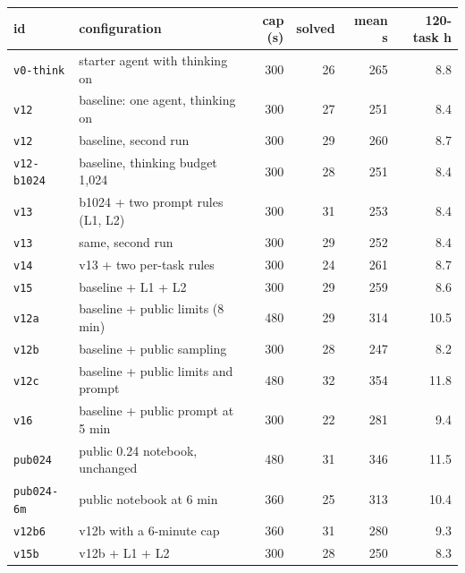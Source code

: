 \begin{tabular}{llrrrr}
\toprule
id & configuration & cap (s) & solved & mean s & 120-task h \\
\midrule
\texttt{v0-think} & starter agent with thinking on & 300 & 26 & 265 & 8.8 \\
\texttt{v12} & baseline: one agent, thinking on & 300 & 27 & 251 & 8.4 \\
\texttt{v12} & baseline, second run & 300 & 29 & 260 & 8.7 \\
\texttt{v12-b1024} & baseline, thinking budget 1,024 & 300 & 28 & 251 & 8.4 \\
\texttt{v13} & b1024 + two prompt rules (L1, L2) & 300 & 31 & 253 & 8.4 \\
\texttt{v13} & same, second run & 300 & 29 & 252 & 8.4 \\
\texttt{v14} & v13 + two per-task rules & 300 & 24 & 261 & 8.7 \\
\texttt{v15} & baseline + L1 + L2 & 300 & 29 & 259 & 8.6 \\
\texttt{v12a} & baseline + public limits (8 min) & 480 & 29 & 314 & 10.5 \\
\texttt{v12b} & baseline + public sampling & 300 & 28 & 247 & 8.2 \\
\texttt{v12c} & baseline + public limits and prompt & 480 & 32 & 354 & 11.8 \\
\texttt{v16} & baseline + public prompt at 5 min & 300 & 22 & 281 & 9.4 \\
\texttt{pub024} & public 0.24 notebook, unchanged & 480 & 31 & 346 & 11.5 \\
\texttt{pub024-6m} & public notebook at 6 min & 360 & 25 & 313 & 10.4 \\
\texttt{v12b6} & v12b with a 6-minute cap & 360 & 31 & 280 & 9.3 \\
\texttt{v15b} & v12b + L1 + L2 & 300 & 28 & 250 & 8.3 \\
\bottomrule
\end{tabular}
